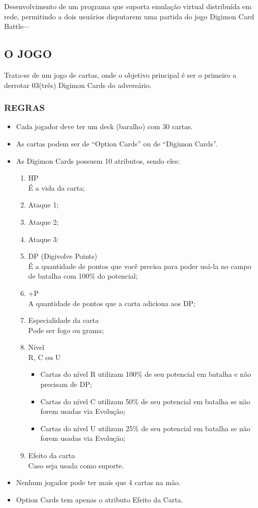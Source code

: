 \documentclass[12pt,a4paper,brazil,abntex2]{article}
\begin{document}
		Desenvolvimento de um programa que suporta emulação virtual distribuída em rede, permitindo a dois usuários disputarem uma partida do jogo Digimon Card Battle$\cdots$
	
	\subsection{\normalsize O JOGO}
		Trata-se de um jogo de cartas, onde o objetivo principal é ser o primeiro a derrotar 03(três) Digimon Cards do adversário.
		
		\subsubsection{\normalsize REGRAS}
			\begin{itemize}
				\item Cada jogador deve ter um deck (baralho) com 30 cartas.
				\item As cartas podem ser de ``Option Cards''  ou de ``Digimon Cards''.
				\item As Digimon Cards possuem 10 atributos, sendo eles:
					\begin{enumerate}

						\item HP\\É a vida da carta;
     					\item Ataque 1;
     					\item Ataque 2;
						\item Ataque 3:
						\item DP (Digivolve Points)\\É a quantidade de pontos que você precisa para poder usá-la no campo de batalha com 100\% do potencial;
     					\item +P\\A quantidade de pontos que a carta adiciona aos DP;
     					\item Especialidade da carta\\Pode ser fogo ou grama;
     					\item Nível\\R, C ou U\\
							\begin{itemize}
								\item Cartas do nível R utilizam 100\% de seu potencial em batalha e não precisam de DP; 
								\item Cartas do nível C utilizam 50\% de seu potencial em batalha se não forem usadas via Evolução; 
								\item Cartas do nível U utilizam 25\% de seu potencial em batalha se não forem usadas via Evolução; 
								\end{itemize}
						\item Efeito da carta\\Caso seja usada como suporte.
					\end{enumerate}
				\item Nenhum jogador pode ter mais que 4 cartas na mão.
				\item Option Cards tem apenas o atributo Efeito da Carta.
			\end{itemize}				
\end{document}
